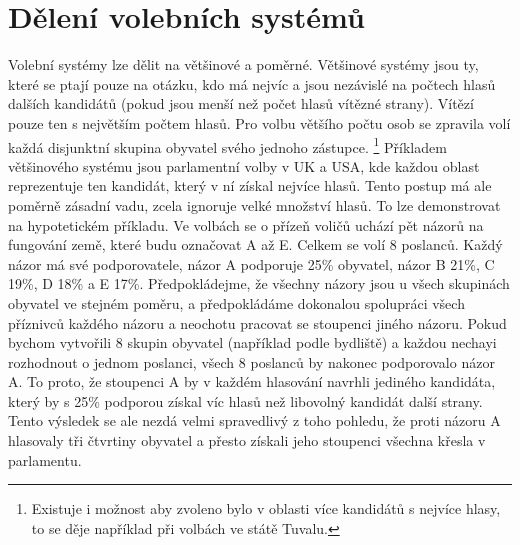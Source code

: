 \documentclass[12pt]{report}
\begin{document}
\section{Dělení volebních systémů} Volební systémy lze dělit na většinové a poměrné.
Většinové systémy jsou ty, které se ptají pouze na otázku, kdo má nejvíc a jsou nezávislé na počtech hlasů dalších kandidátů (pokud jsou menší než počet hlasů vítězné strany).
Vítězí pouze ten s největším počtem hlasů.
Pro volbu většího počtu osob se zpravila volí každá disjunktní skupina obyvatel svého jednoho zástupce.
\footnote{Existuje i možnost aby zvoleno bylo v oblasti více kandidátů s nejvíce hlasy, to se děje například při volbách ve státě Tuvalu.\autocite{TUV}} Příkladem většinového systému jsou parlamentní volby v UK a USA, kde každou oblast reprezentuje ten kandidát, který v ní získal nejvíce hlasů.
Tento postup má ale poměrně zásadní vadu, zcela ignoruje velké množství hlasů.
To lze demonstrovat na hypotetickém příkladu.
Ve volbách se o přízeň voličů uchází pět názorů na fungování země, které budu označovat A až E.
Celkem se volí 8 poslanců.
Každý názor má své podporovatele, názor A podporuje 25\% obyvatel, názor B 21\%, C 19\%, D 18\% a E 17\%.
Předpokládejme, že všechny názory jsou u všech skupinách obyvatel ve stejném poměru, a předpokládáme dokonalou spolupráci všech příznivců každého názoru a neochotu pracovat se stoupenci jiného názoru.
Pokud bychom vytvořili 8 skupin obyvatel (například podle bydliště) a každou nechayi rozhodnout o jednom poslanci, všech 8 poslanců by nakonec podporovalo názor A.
To proto, že stoupenci A by v každém hlasování navrhli jediného kandidáta, který by s 25\% podporou získal víc hlasů než libovolný kandidát další strany.
Tento výsledek se ale nezdá velmi spravedlivý z toho pohledu, že proti názoru A hlasovaly tři čtvrtiny obyvatel a přesto získali jeho stoupenci všechna křesla v parlamentu.
\end{document}
